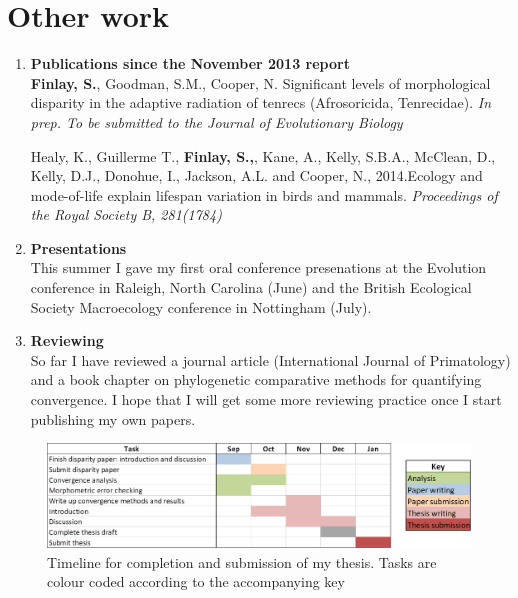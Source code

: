 \documentclass[12pt,a4paper]{article}
\begin{document}
\section{Other work}
	
	\begin{enumerate}

	\item \textbf{Publications since the November 2013 report}\\
		\textbf{Finlay, S.}, Goodman, S.M., Cooper, N. Significant levels of morphological disparity in the adaptive radiation of tenrecs (Afrosoricida, Tenrecidae). \textit{In prep. To be submitted to the Journal of Evolutionary Biology}\\
	
	\bigskip 
	
		Healy, K., Guillerme T., \textbf{Finlay, S.,}, Kane, A., Kelly, S.B.A., McClean, D., Kelly, D.J., Donohue, I., Jackson, A.L. and Cooper, N., 2014.Ecology and mode-of-life explain lifespan variation in birds and mammals. \textit{Proceedings of the Royal Society B, 281(1784)} 

	\item \textbf{Presentations}\\
		This summer I gave my first oral conference presenations at the Evolution conference in Raleigh, North Carolina (June) and the British Ecological Society Macroecology conference in Nottingham (July). 

	\item \textbf{Reviewing}\\

		So far I have reviewed a journal article (International Journal of Primatology) and a book chapter on phylogenetic comparative methods for quantifying convergence. I hope that I will get some more reviewing practice once I start publishing my own papers.

	\end{enumerate}

\begin{landscape}
  \begin{figure}[p]
	\centering
	\includegraphics[keepaspectratio=true]{Gannt_July.png}
	\caption{Timeline for completion and submission of my thesis. Tasks are colour coded according to the accompanying key}
	\label{gantt}
  \end{figure}
\end{landscape}



 
\end{document}
